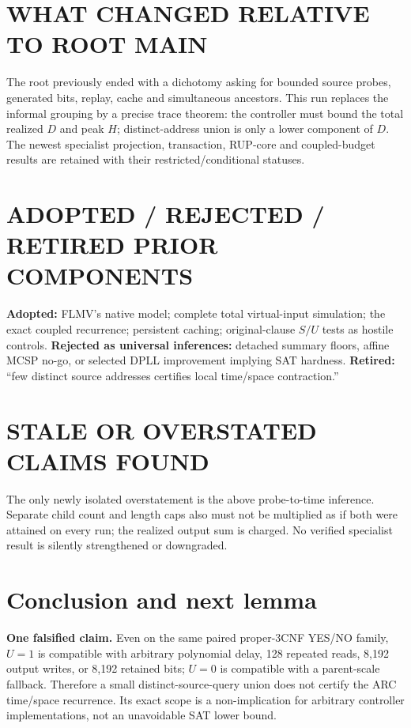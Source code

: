 \documentclass[11pt]{article}
\begin{document}
\section{WHAT CHANGED RELATIVE TO ROOT MAIN}
The root previously ended with a dichotomy asking for bounded source probes,
generated bits, replay, cache and simultaneous ancestors.  This run replaces
the informal grouping by a precise trace theorem: the controller must bound
the total realized $D$ and peak $H$; distinct-address union is only a lower
component of $D$.  The newest specialist projection, transaction, RUP-core and
coupled-budget results are retained with their restricted/conditional statuses.

\section{ADOPTED / REJECTED / RETIRED PRIOR COMPONENTS}
\textbf{Adopted:} FLMV's native model; complete total virtual-input simulation;
the exact coupled recurrence; persistent caching; original-clause $S/U$ tests
as hostile controls.  \textbf{Rejected as universal inferences:} detached
summary floors, affine MCSP no-go, or selected DPLL improvement implying SAT
hardness.  \textbf{Retired:} ``few distinct source addresses certifies local
time/space contraction.''

\section{STALE OR OVERSTATED CLAIMS FOUND}
The only newly isolated overstatement is the above probe-to-time inference.
Separate child count and length caps also must not be multiplied as if both
were attained on every run; the realized output sum is charged.  No verified
specialist result is silently strengthened or downgraded.

\section{Conclusion and next lemma}
\textbf{One falsified claim.}  Even on the same paired proper-3CNF YES/NO family,
$U=1$ is compatible with arbitrary polynomial delay, 128 repeated reads,
8,192 output writes, or 8,192 retained bits; $U=0$ is compatible with a
parent-scale fallback.  Therefore a small distinct-source-query union does not
certify the ARC time/space recurrence.  Its exact scope is a non-implication
for arbitrary controller implementations, not an unavoidable SAT lower bound.
\end{document}
